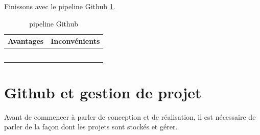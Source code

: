 \documentclass[
    iai, %
    il, %
]{heig-tb}
\begin{document}
Finissons avec le pipeline Github \ref{devops-github}.
\begin{table}[h]
    \begin{center}
        \caption{pipeline Github \label{devops-github}}
        \begin{tabularx}{1.0\textwidth} {X|X}
            Avantages & Inconvénients \\ \hline
                      &               \\
                      &               \\
                      &               \\
                      &               \\
                      &               \\
        \end{tabularx}
    \end{center}
\end{table}





\chapter{Github et gestion de projet}
Avant de commencer à parler de conception et de réalisation, il est nécessaire de parler de la façon dont les projets sont stockés et gérer.
\end{document}
